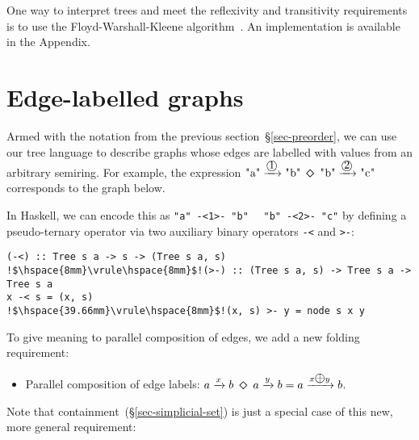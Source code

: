 \documentclass[english,submission]{programming}
\newcommand{\code}[1]{\lstinline[mathescape]|#1|}
\newcommand{\hdia}{\,\text{\raisebox{-0.2mm}{\Large\color{darkblue} $\diamond$}}\,}
\newcommand{\add}{\text{\raisebox{-0.1mm}{\large $\oplus$}}}
\newcommand{\one}{\raisebox{-0.2mm}{\textcircled{1}}\xspace}
\newcommand{\two}{\raisebox{-0.2mm}{\textcircled{2}}\xspace}
\newcommand{\dia}{\,\text{\raisebox{-0.3mm}{\Large $\diamond$}}\,}
\begin{document}

One way to interpret trees and meet the reflexivity and transitivity
requirements is to use the Floyd-Warshall-Kleene
algorithm~\cite{hopcroft_ullman}\cite{kleene1951representation}. An
implementation is available in the Appendix.

\section{Edge-labelled graphs}\label{sec-labelled}

Armed with the notation from the previous section~\S\ref{sec-preorder}, we can
use our tree language to describe graphs whose edges are labelled with values
from an arbitrary semiring. For example, the expression
$\text{\code{"a"}} \xrightarrow{\one} \text{\code{"b"}}\ \dia\ \text{\code{"b"}} \xrightarrow{\two} \text{\code{"c"}}$
corresponds to the graph below.

\vspace{2mm}
\hfill\hfill
\vspace{3mm}

\noindent
In Haskell, we can encode this as
\code{"a"}~\code{-<1>-}~\code{"b"}~\hdia~\code{"b"}~\code{-<2>-}~\code{"c"}
by defining a pseudo-ternary operator via two auxiliary binary operators
\code{-<} and \code{>-}:

\begin{lstlisting}
(-<) :: Tree s a -> s -> (Tree s a, s)  !$\hspace{8mm}\vrule\hspace{8mm}$!(>-) :: (Tree s a, s) -> Tree s a -> Tree s a
x -< s = (x, s)                         !$\hspace{39.66mm}\vrule\hspace{8mm}$!(x, s) >- y = node s x y
\end{lstlisting}

\noindent
To give meaning to parallel composition of edges, we add a new folding requirement:

\begin{itemize}
    \item Parallel composition of edge labels:
    $a \xrightarrow{x} b\ \dia\ a \xrightarrow{y} b = a \xrightarrow{x \add y} b$.
\end{itemize}

\noindent
Note that containment~(\S\ref{sec-simplicial-set}) is just a special case of
this new, more general requirement:
\end{document}
